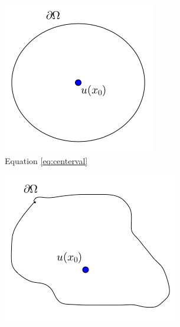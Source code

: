 \begin{figure}[!htb]
  \centering
  \begin{subfigure}[b]{0.3\textwidth}
    \centering
  \includegraphics[width=\textwidth]{styles/CircCenter}
  \caption{Equation \ref{eq:centerval}}\label{fig:circcenter}
\end{subfigure}
\hfill
  \begin{subfigure}[b]{0.3\textwidth}
    \centering
  \includegraphics[width=\textwidth]{styles/GeneralOffset}

\end{subfigure}
\end{figure}
